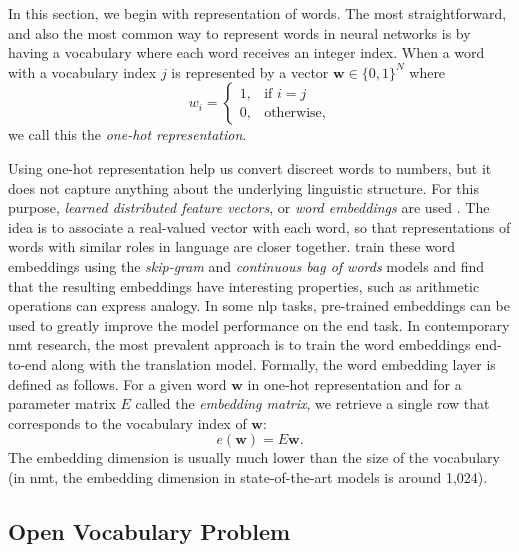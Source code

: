 In this section, we begin with representation of words. The most 
straightforward, and also the most common way to represent words in neural
networks is by having a vocabulary where each word receives an integer index.
When a word with a vocabulary index $j$ is represented by a vector $\mathbf{w} \in \{0,1\}^N$ where 
%
\begin{equation}
w_i =
\begin{cases}
	1, & \text{if } i = j \\
	0, & \text{otherwise,}
\end{cases}
\end{equation}
%
we call this the \emph{one-hot representation}.

Using one-hot representation help us convert discreet words to numbers,
but it does not capture anything about the underlying linguistic structure.
For this purpose, \emph{learned distributed feature vectors}, or \emph{word 
embeddings} are used \citep{bengio2003neural} . The idea is to associate
a real-valued vector with each word, so that representations of words with 
similar roles in language are closer together. \citet{mikolov2013distributed} 
train these word embeddings using the \emph{skip-gram} and \emph{continuous bag 
of words} models and find that the resulting embeddings have interesting 
properties, such as arithmetic operations can express analogy.
In some \gls{nlp} tasks, pre-trained embeddings can be used to greatly improve
the model performance on the end task. In contemporary \gls{nmt} research,
the most prevalent approach is to train the word embeddings end-to-end along
 with the translation model. 
 Formally, the word embedding layer is defined as follows. For a given word $\textbf{w}$ in one-hot representation and for a parameter matrix $E$ called the \emph{embedding matrix}, we retrieve a single row that corresponds to the
vocabulary index of $\mathbf{w}$:
%
\begin{equation}
e(\mathbf{w}) = E\mathbf{w}.
\end{equation}
%
The embedding dimension is usually much lower than the size of the vocabulary 
(in \gls{nmt}, the embedding dimension in state-of-the-art models is around 1,024).


\subsection{Open Vocabulary Problem}


